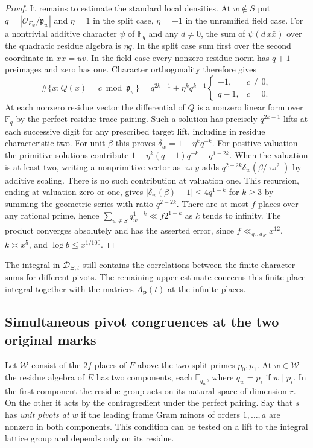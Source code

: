 \documentclass[a4paper,11pt]{article}
\theoremstyle{definition}
\theoremstyle{remark}
\numberwithin{equation}{section}
\begin{document}
\begin{proof}
It remains to estimate the standard local densities. At
\(w\notin S\) put \(q=|\mathcal O_{F_w}/\mathfrak p_w|\) and
\(\eta=1\) in the split case, \(\eta=-1\) in the unramified
field case. For a nontrivial additive character \(\psi\) of
\(\mathbb F_q\) and any \(d\ne0\), the sum of
\(\psi(d\,x\bar x)\) over the quadratic residue algebra is
\(\eta q\). In the split case sum first over the second
coordinate in \(x\bar x=u v\). In the field case every nonzero
residue norm has \(q+1\) preimages and zero has one.
Character orthogonality therefore gives
\[
 \#\{x: Q(x)=c\bmod\mathfrak p_w\}
   =q^{2k-1}+\eta^k q^{k-1}
       \begin{cases}-1,&c\ne0,\\q-1,&c=0.\end{cases}
\]
At each nonzero residue vector the differential of \(Q\) is
a nonzero linear form over \(\mathbb F_q\) by the perfect
residue trace pairing. Such a solution has precisely
\(q^{2k-1}\) lifts at each successive digit for any prescribed
target lift, including in residue characteristic two.
For unit \(\beta\) this proves \(\delta_w=1-\eta^k q^{-k}\).
For positive valuation the primitive solutions contribute
\(1+\eta^k(q-1)q^{-k}-q^{1-2k}\).
When the valuation is at least two, writing a nonprimitive
vector as \(\varpi y\) adds
\(q^{2-2k}\delta_w(\beta/\varpi^2)\) by additive scaling.
There is no such contribution at valuation one. This recursion,
ending at valuation zero or one, gives
\(|\delta_w(\beta)-1|\le 4q^{1-k}\) for \(k\ge3\) by summing
the geometric series with ratio \(q^{2-2k}\).
There are at most \(f\) places over any rational prime, hence
\(\sum_{w\notin S}q_w^{1-k}\ll f2^{1-k}\) as \(k\) tends to
infinity. The product converges absolutely and has the
asserted error, since \(f\ll_{q_0,d_K}x^{12}\),
\(k\asymp x^5\), and \(\log b\le x^{1/100}\).
\end{proof}

The integral in \(\mathcal D_{\Xi,t}\) still contains the
correlations between the finite character sums for different
pivots. The remaining upper estimate concerns this finite-place
integral together with the matrices \(A_{\mathbf p}(t)\) at the
infinite places.
\clearpage

\subsection{Simultaneous pivot congruences at the two original marks}
\label{sec:bothmarks873}

Let \(\mathcal W\) consist of the \(2f\) places of \(F\) above the
two split primes \(p_0,p_1\). At \(w\in\mathcal W\) the residue
algebra of \(E\) has two components, each \(\mathbb F_{q_w}\),
where \(q_w=p_i\) if \(w\mid p_i\). In the first component the
residue group acts on its natural space of dimension \(r\).
On the other it acts by the contragredient under the perfect
pairing. Say that \(s\) has \emph{unit pivots at \(w\)} if the
leading frame Gram minors of orders \(1,\ldots,a\) are nonzero
in both components. This condition can be tested on a lift to
the integral lattice group and depends only on its residue.
\end{document}
